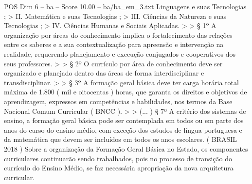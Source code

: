 \begin{textsample}{POS Dim 6 – ba – Score 10.00 – ba/ba\_em\_3.txt}
Linguagens e suas Tecnologias ; > II.
Matemática e suas Tecnologias ; > III.
Ciências da Natureza e suas Tecnologias ; > IV.
Ciências Humanas e Sociais Aplicadas. > > § 1º A organização por áreas do conhecimento implica o fortalecimento das relações entre os saberes e a sua contextualização para apreensão e intervenção na realidade, requerendo planejamento e execução conjugados e cooperativos dos seus professores. > > § 2º O currículo por área de conhecimento deve ser organizado e planejado dentro das áreas de forma interdisciplinar e transdisciplinar. > > § 3º A formação geral básica deve ter carga horária total máxima de 1.800 ( mil e oitocentas ) horas, que garanta os direitos e objetivos de aprendizagem, expressos em competências e habilidades, nos termos da Base Nacional Comum Curricular ( BNCC ). > > (... ) § 7º A critério dos sistemas de ensino, a formação geral básica pode ser contemplada em todos ou em parte dos anos do curso do ensino médio, com exceção dos estudos de língua portuguesa e da matemática que devem ser incluídos em todos os anos escolares. ( BRASIL 2018 ) Sobre a organização da Formação Geral Básica no Estado, os componentes curriculares continuarão sendo trabalhados, pois no processo de transição do currículo do Ensino Médio, se faz necessária apropriação da nova arquitetura curricular.

\end{textsample}

